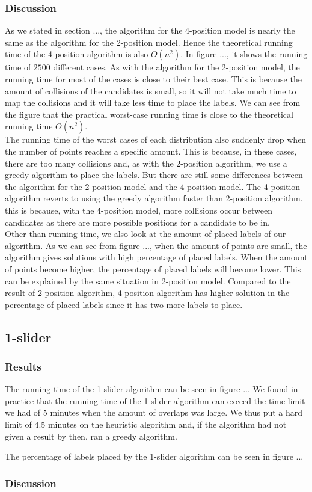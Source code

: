 \documentclass[crop=false,a4paper,oneside,11pt]{standalone}
\begin{document}
\subsubsection{Discussion}
As we stated in section ..., the algorithm for the 4-position model is nearly the same as the algorithm for the 2-position model. Hence the theoretical running time of the 4-position algorithm is also $O(n^2)$. In figure ..., it shows the running time of $2500$ different cases. As with the algorithm for the 2-position model, the running time for most of the cases is close to their best case. This is because the amount of collisions of the candidates is small, so it will not take much time to map the collisions and it will take less time to place the labels. We can see from the figure that the practical worst-case running time is close to the theoretical running time $O(n^2)$. \\
The running time of the worst cases of each distribution also suddenly drop when the number of points reaches a specific amount. This is because, in these cases, there are too many collisions and, as with the 2-position algorithm, we use a greedy algorithm to place the labels. But there are still some differences between the algorithm for the 2-position model and the 4-position model. The 4-position algorithm reverts to using the greedy algorithm faster than 2-position algorithm. this is because, with the 4-position model, more collisions occur between candidates as there are more possible positions for a candidate to be in.\\
Other than running time, we also look at the amount of placed labels of our algorithm. As we can see from figure ..., when the amount of points are small, the algorithm gives solutions with high percentage of placed labels. When the amount of points become higher, the percentage of placed labels will become lower. This can be explained by the same situation in 2-position model. Compared to the result of 2-position algorithm, 4-position algorithm has higher solution in the percentage of placed labels since it has two more labels to place.\\

\subsection{1-slider}
\subsubsection{Results}
The running time of the 1-slider algorithm can be seen in figure ... We found in practice that the running time of the 1-slider algorithm can exceed the time limit we had of 5 minutes when the amount of overlaps was large. We thus put a hard limit of 4.5 minutes on the heuristic algorithm and, if the algorithm had not given a result by then, ran a greedy algorithm.

The percentage of labels placed by the 1-slider algorithm can be seen in figure ...
\subsubsection{Discussion}
\end{document}
